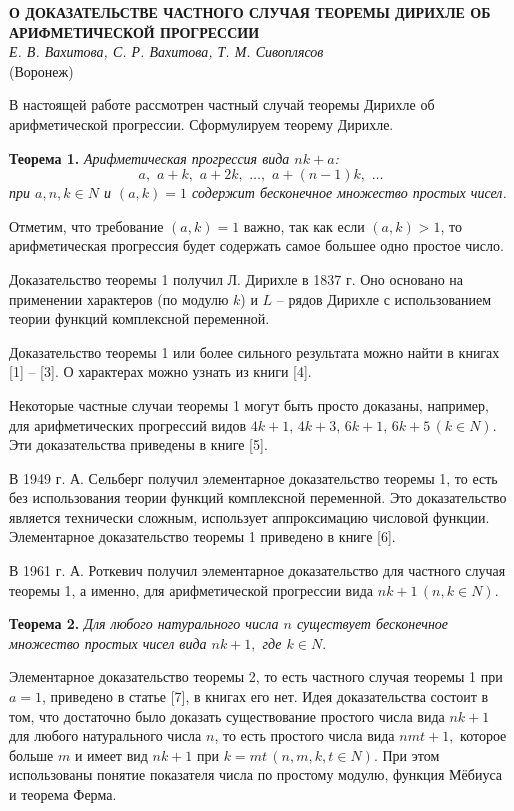 \begin{center}{ \bf О ДОКАЗАТЕЛЬСТВЕ ЧАСТНОГО СЛУЧАЯ ТЕОРЕМЫ ДИРИХЛЕ ОБ АРИФМЕТИЧЕСКОЙ ПРОГРЕССИИ}\\
{\it Е. В. Вахитова, С. Р.  Вахитова, Т. М. Сивоплясов} \\
 (Воронеж)
\end{center}



В настоящей работе рассмотрен частный случай теоремы Дирихле об арифметической прогрессии. Сформулируем теорему Дирихле.

\textbf{Теорема 1.} \emph{Арифметическая прогрессия вида $nk+a$:
$$a,\,\, a+ k,\,\, a+2k,\,\, …,\,\, a+ (n -1)k,\,\, …$$
при $a,n,k \in N$ и $(a,k)= 1$ содержит бесконечное множество простых чисел.}

Отметим, что требование $(a,k)= 1$  важно, так как если $(a,k)> 1$, то арифметическая прогрессия будет содержать самое большее одно простое число.

Доказательство теоремы 1 получил Л. Дирихле в 1837 г. Оно основано на применении характеров (по модулю $k$) и $L$ -- рядов Дирихле с использованием теории функций комплексной переменной.

Доказательство теоремы 1 или более сильного результата можно найти в книгах [1] -- [3]. О характерах можно узнать из книги [4].

Некоторые частные случаи теоремы 1 могут быть просто доказаны, например, для арифметических прогрессий видов $4k +1,\, 4k+ 3,\, 6k+ 1,\, 6k+ 5\, (k \in N).$ Эти доказательства приведены в книге [5].

В 1949 г. А. Сельберг получил элементарное доказательство теоремы 1, то есть без использования теории функций комплексной переменной. Это доказательство является технически сложным, использует аппроксимацию числовой функции. Элементарное доказательство теоремы 1 приведено в книге [6].

В 1961 г. А. Роткевич получил элементарное доказательство для частного случая теоремы 1, а именно, для арифметической прогрессии вида $nk+ 1\, (n,k \in N).$

\textbf{Теорема 2.} \emph{Для любого натурального числа $n$ существует бесконечное множество простых чисел вида $nk+1,$ где $k\in N.$}

Элементарное доказательство теоремы 2, то есть частного случая теоремы 1 при $a= 1$, приведено в статье [7], в книгах его нет. Идея доказательства состоит в том, что достаточно было доказать существование простого числа вида $nk +1$ для любого натурального числа $n$, то есть простого числа вида $n m t+ 1,$ которое больше $m$  и имеет вид $nk +1$ при  $k= m t \,(n,m,k,t \in N).$ При этом использованы понятие показателя числа по простому модулю, функция Мёбиуса и теорема Ферма.






